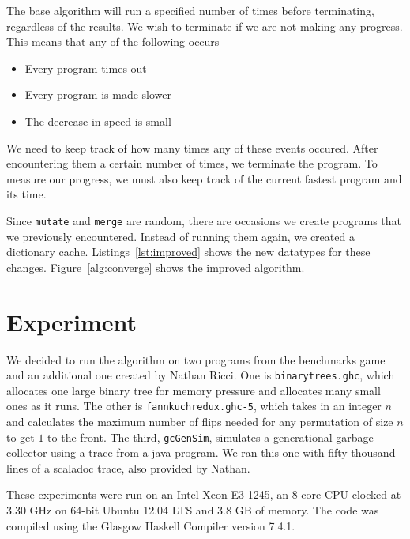 \documentclass[preprint,nocopyrightspace]{sigplanconf}
\begin{document}
The base algorithm will run a specified number of times before terminating, regardless of the results. We wish to terminate if we are not making any progress. This means that any of the following occurs
\begin{itemize}
\item Every program times out
\item Every program is made slower
\item The decrease in speed is small
\end{itemize}
We need to keep track of how many times any of these events occured. After encountering them a certain number of times, we terminate the program. To measure our progress, we must also keep track of the current fastest program and its time.

Since \lstinline!mutate! and \lstinline!merge! are random, there are occasions we create programs that we previously encountered. Instead of running them again, we created a dictionary cache. Listings~\ref{lst:improved} shows the new datatypes for these changes. Figure~\ref{alg:converge} shows the improved algorithm.
\section{Experiment}\label{sec:expr}
We decided to run the algorithm on two programs from the benchmarks game~\cite{bgames} and an additional one created by Nathan Ricci. One is \lstinline!binarytrees.ghc!, which allocates one large binary tree for memory pressure and allocates many small ones as it runs. The other is \lstinline!fannkuchredux.ghc-5!, which takes in an integer $n$ and calculates the maximum number of flips needed for any permutation of size $n$ to get $1$ to the front. The third, \lstinline!gcGenSim!, simulates a generational garbage collector using a trace from a java program. We ran this one with fifty thousand lines of a scaladoc trace, also provided by Nathan.

These experiments were run on an Intel Xeon E3-1245, an 8 core CPU clocked at 3.30 GHz on 64-bit Ubuntu 12.04 LTS and 3.8 GB of memory. The code was compiled using the Glasgow Haskell Compiler version 7.4.1.

\end{document}
